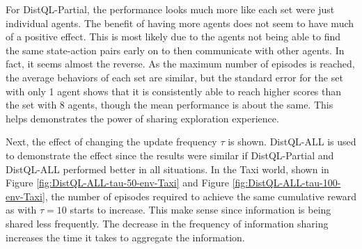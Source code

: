 \documentclass[jair,twoside,11pt,theapa]{article}
\begin{document}
For DistQL-Partial, the performance looks much more like each set were just individual agents. The benefit of having more agents does not seem to have much of a positive effect. This is most likely due to the agents not being able to find the same state-action pairs early on to then communicate with other agents. In fact, it seems almost the reverse. As the maximum number of episodes is reached, the average behaviors of each set are similar, but the standard error for the set with only 1 agent shows that it is consistently able to reach higher scores than the set with 8 agents, though the mean performance is about the same. This helps demonstrates the power of sharing exploration experience. 

Next, the effect of changing the update frequency $\tau$ is shown. DistQL-ALL is used to demonstrate the effect since the results were similar if DistQL-Partial and DistQL-ALL performed better in all situations. In the Taxi world, shown in Figure \ref{fig:DistQL-ALL-tau-50-env-Taxi} and Figure \ref{fig:DistQL-ALL-tau-100-env-Taxi}, the number of episodes required to achieve the same cumulative reward as with $\tau=10$ starts to increase. This make sense since information is being shared less frequently. The decrease in the frequency of information sharing increases the time it takes to aggregate the information.
\end{document}

